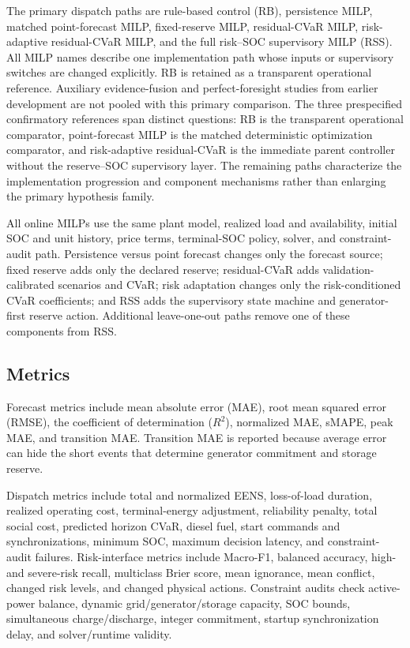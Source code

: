The primary dispatch paths are rule-based control (RB), persistence MILP,
matched point-forecast MILP, fixed-reserve MILP, residual-CVaR MILP,
risk-adaptive residual-CVaR MILP, and the full risk--SOC supervisory MILP
(RSS). All MILP names describe one implementation path whose inputs or
supervisory switches are changed explicitly. RB is retained as a transparent
operational reference. Auxiliary evidence-fusion and perfect-foresight studies
from earlier development are not pooled with this primary comparison.
The three prespecified confirmatory references span distinct questions: RB is
the transparent operational comparator, point-forecast MILP is the matched
deterministic optimization comparator, and risk-adaptive residual-CVaR is the
immediate parent controller without the reserve--SOC supervisory layer. The
remaining paths characterize the implementation progression and component
mechanisms rather than enlarging the primary hypothesis family.

All online MILPs use the same plant model, realized load and availability,
initial SOC and unit history, price terms, terminal-SOC policy, solver, and
constraint-audit path. Persistence versus point forecast changes only the
forecast source; fixed reserve adds only the declared reserve; residual-CVaR
adds validation-calibrated scenarios and CVaR; risk adaptation changes only the
risk-conditioned CVaR coefficients; and RSS adds the supervisory state machine
and generator-first reserve action. Additional leave-one-out paths remove one
of these components from RSS.

\subsection{Metrics}\label{metrics}

Forecast metrics include mean absolute error (MAE), root mean squared
error (RMSE), the coefficient of determination ($R^2$), normalized MAE,
sMAPE, peak MAE, and transition MAE. Transition MAE is reported because
average error can hide the short events that determine generator
commitment and storage reserve.

Dispatch metrics include total and normalized EENS, loss-of-load duration,
realized operating cost, terminal-energy adjustment, reliability penalty,
total social cost, predicted horizon CVaR, diesel fuel, start commands and
synchronizations, minimum SOC, maximum decision latency, and constraint-audit
failures. Risk-interface
metrics include Macro-F1, balanced accuracy, high- and severe-risk recall,
multiclass Brier score, mean ignorance, mean conflict, changed risk levels, and
changed physical actions.
Constraint audits check active-power balance, dynamic grid/generator/storage
capacity, SOC bounds, simultaneous charge/discharge, integer commitment,
startup synchronization delay, and solver/runtime validity.

